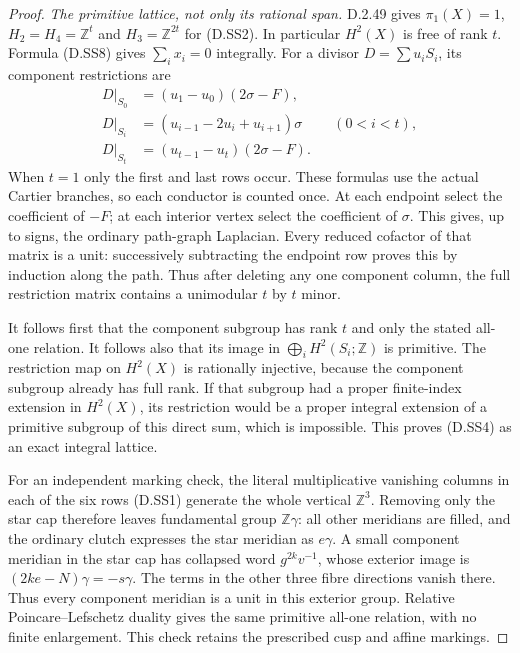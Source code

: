 \begin{proof}
\emph{The primitive lattice, not only its rational span.}
D.2.49 gives $\pi_1(X)=1$, $H_2=H_4=\mathbb Z^t$ and
$H_3=\mathbb Z^{2t}$ for (D.SS2). In particular $H^2(X)$ is free
of rank $t$. Formula (D.SS8) gives $\sum_i x_i=0$ integrally.
For a divisor $D=\sum u_iS_i$, its component restrictions are
\[
\begin{aligned}
 D|_{S_0}&=(u_1-u_0)(2\sigma-F),\\
 D|_{S_i}&=(u_{i-1}-2u_i+u_{i+1})\sigma
                                  &&(0<i<t),\\
 D|_{S_t}&=(u_{t-1}-u_t)(2\sigma-F).
\end{aligned}                                               \tag{D.SS10}
\]
When $t=1$ only the first and last rows occur. These formulas use
the actual Cartier branches, so each conductor is counted once.
At each endpoint select the coefficient of $-F$; at each interior
vertex select the coefficient of $\sigma$. This gives, up to signs,
the ordinary path-graph Laplacian. Every reduced cofactor of that
matrix is a unit: successively subtracting the endpoint row proves
this by induction along the path. Thus after deleting any one
component column, the full restriction matrix contains a unimodular
$t$ by $t$ minor.

It follows first that the component subgroup has rank $t$ and only
the stated all-one relation. It follows also that its image in
$\bigoplus_iH^2(S_i;\mathbb Z)$ is primitive. The restriction map
on $H^2(X)$ is rationally injective, because the component subgroup
already has full rank. If that subgroup had a proper finite-index
extension in $H^2(X)$, its restriction would be a proper integral
extension of a primitive subgroup of this direct sum, which is
impossible. This proves (D.SS4) as an exact integral lattice.

For an independent marking check, the literal multiplicative
vanishing columns in each of the six rows (D.SS1) generate the
whole vertical $\mathbb Z^3$. Removing only the star cap therefore
leaves fundamental group $\mathbb Z\gamma$: all other meridians
are filled, and the ordinary clutch expresses the star meridian
as $e\gamma$. A small component meridian in the star cap has
collapsed word $g^{2k}v^{-1}$, whose exterior image is
$(2ke-N)\gamma=-s\gamma$. The terms in the other three fibre
directions vanish there. Thus every component meridian is a unit
in this exterior group. Relative Poincare--Lefschetz duality gives
the same primitive all-one relation, with no finite enlargement.
This check retains the prescribed cusp and affine markings.


\end{proof}
